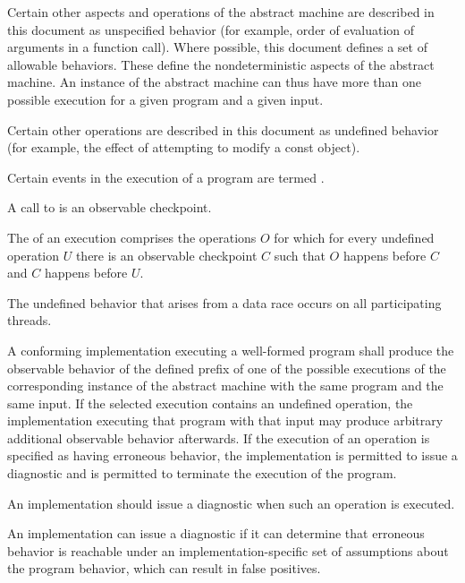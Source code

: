 \pnum
{}%
Certain other aspects and operations of the abstract machine are
described in this document as unspecified behavior (for example,
order of evaluation of arguments in a function call).
Where possible, this
document defines a set of allowable behaviors. These
define the nondeterministic aspects of the abstract machine. An instance
of the abstract machine can thus have more than one possible execution
for a given program and a given input.

\pnum
{}%
Certain other operations are described in this document as
undefined behavior (for example, the effect of
attempting to modify a const object).

\pnum
Certain events in the execution of a program
are termed .
\begin{note}
A call to 
is an observable checkpoint.
\end{note}

\pnum
{}%
%
The  of an execution
comprises the operations $O$
for which for every undefined operation $U$
there is an observable checkpoint $C$
such that $O$ happens before $C$ and
$C$ happens before $U$.

\begin{note}
The undefined behavior that arises from a data race
occurs on all participating threads.
\end{note}

A conforming implementation executing a well-formed program shall
produce the observable behavior
of the defined prefix
of one of the possible executions
of the corresponding instance
of the abstract machine with the
same program and the same input.
%
If the selected execution contains an undefined operation,
the implementation executing that program with that input
may produce arbitrary additional observable behavior afterwards.
If the execution of an operation is specified as having erroneous behavior,
the implementation is permitted to issue a diagnostic and
is permitted to terminate the execution of the program.

\pnum
\recommended
An implementation should issue a diagnostic when such an operation is executed.
\begin{note}
An implementation can issue a diagnostic
if it can determine that erroneous behavior is reachable
under an implementation-specific set of assumptions about the program behavior,
which can result in false positives.
\end{note}

